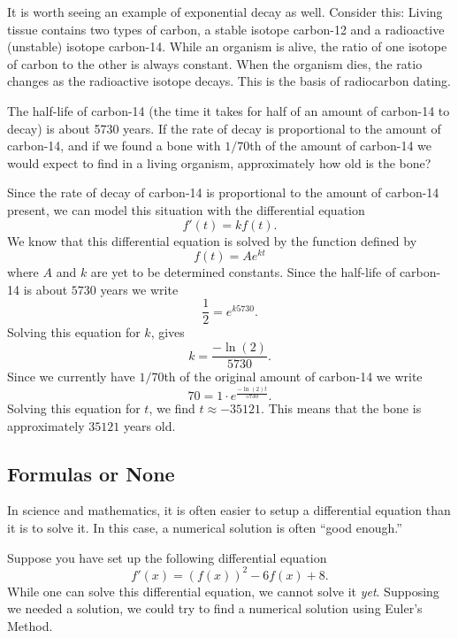 It is worth seeing an example of exponential decay as well. Consider
this: Living tissue contains two types of carbon, a stable
isotope carbon-12 and a radioactive (unstable) isotope
carbon-14. While an organism is alive, the ratio of one isotope of
carbon to the other is always constant. When the organism dies, the
ratio changes as the radioactive isotope decays. This is the basis of
radiocarbon dating.


\begin{example}
The half-life of carbon-14 (the time it takes for half of an amount of
carbon-14 to decay) is about 5730 years. If the rate of decay is
proportional to the amount of carbon-14, and if we found a bone with
$1/70$th of the amount of carbon-14 we would expect to find in a living
organism, approximately how old is the bone?
\end{example}

\begin{solution}
Since the rate of decay of carbon-14 is proportional to the amount of
carbon-14 present, we can model this situation with the differential
equation
\[
f'(t) = k f(t).
\]
We know that this differential equation is solved by the function
defined by
\[
f(t) = A e^{kt}
\]
where $A$ and $k$ are yet to be determined constants. Since the
half-life of carbon-14 is about $5730$ years we write
\[
\frac{1}{2} = e^{k 5730}.
\]
Solving this equation for $k$, gives
\[
k = \frac{-\ln(2)}{5730}.
\]
Since we currently have $1/70$th of the original amount of carbon-14
we write
\[
70 = 1\cdot e^{\frac{-\ln(2)t}{5730}}.
\]
Solving this equation for $t$, we find $t \approx -35121$. This means
that the bone is approximately $35121$ years old.
\end{solution}


\subsection*{Formulas or None}

In science and mathematics, it is often easier to setup a differential
equation than it is to solve it. In this case, a numerical
solution is often ``good enough.''

Suppose you have set up the following differential equation
\[
f'(x) = \left(f(x)\right)^2 - 6f(x) + 8.
\]
While one can solve this differential equation, we cannot solve it
\textit{yet}. Supposing we needed a solution, we could try to find a
numerical solution using Euler's Method.

